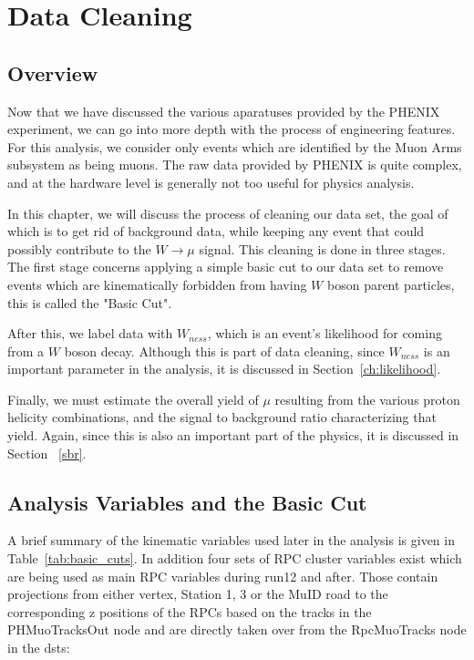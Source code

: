 \chapter{Data Cleaning}
\label{ch:data_collection}
\section{Overview}
Now that we have discussed the various aparatuses provided by the PHENIX
experiment, we can go into more depth with the process of engineering features.
For this analysis, we consider only events which are identified by the Muon Arms
subsystem as being muons. The raw data provided by PHENIX is quite complex, and
at the hardware level is generally not too useful for physics analysis.

In this chapter, we will discuss the process of cleaning our data set, the goal
of which is to get rid of background data, while keeping any event that could
possibly contribute to the $W\rightarrow\mu$ signal. This cleaning is done in
three stages. The first stage concerns applying a simple basic cut to our data
set to remove events which are kinematically forbidden from having $W$ boson
parent particles, this is called the "Basic Cut".

After this, we label data with $W_{ness}$, which is an event's likelihood for
coming from a $W$ boson decay. Although this is part of data cleaning, since
$W_{ness}$ is an important parameter in the analysis, it is discussed in
Section~\ref{ch:likelihood}.

Finally, we must estimate the overall yield of $\mu$ resulting from the various
proton helicity combinations, and the signal to background ratio characterizing
that yield. Again, since this is also an important part of the physics, it is
discussed in Section ~\ref{sbr}.

\section{Analysis Variables and the Basic Cut}

A brief summary of the kinematic variables used later in the analysis is given
in Table~\ref{tab:basic_cuts}. In addition four sets of RPC cluster variables exist
which are being used as main RPC variables during run12 and after. Those contain
projections from either vertex, Station 1, 3 or the MuID road to the
corresponding z positions of the RPCs based on the tracks in the PHMuoTracksOut
node and are directly taken over from the RpcMuoTracks node in the dsts:


